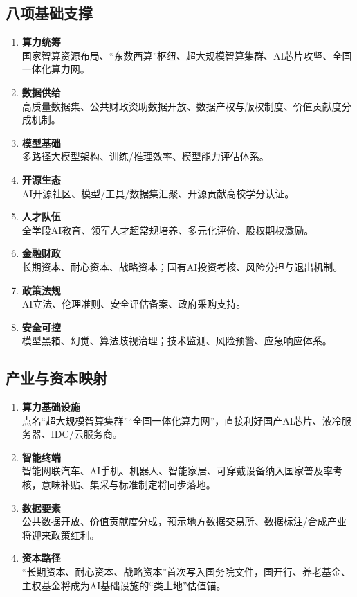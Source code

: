 \subsection{八项基础支撑}
\begin{enumerate}[leftmargin=*, nosep]
    \item \textbf{算力统筹}  \\
    国家智算资源布局、“东数西算”枢纽、超大规模智算集群、AI芯片攻坚、全国一体化算力网。
    \item \textbf{数据供给}  \\
    高质量数据集、公共财政资助数据开放、数据产权与版权制度、价值贡献度分成机制。
    \item \textbf{模型基础}  \\
    多路径大模型架构、训练/推理效率、模型能力评估体系。
    \item \textbf{开源生态}  \\
    AI开源社区、模型/工具/数据集汇聚、开源贡献高校学分认证。
    \item \textbf{人才队伍}  \\
    全学段AI教育、领军人才超常规培养、多元化评价、股权期权激励。
    \item \textbf{金融财政}  \\
    长期资本、耐心资本、战略资本；国有AI投资考核、风险分担与退出机制。
    \item \textbf{政策法规}  \\
    AI立法、伦理准则、安全评估备案、政府采购支持。
    \item \textbf{安全可控}  \\
    模型黑箱、幻觉、算法歧视治理；技术监测、风险预警、应急响应体系。
\end{enumerate}

\subsection{产业与资本映射}
\begin{enumerate}[leftmargin=*, nosep]
    \item \textbf{算力基础设施}  \\
    点名“超大规模智算集群”“全国一体化算力网”，直接利好国产AI芯片、液冷服务器、IDC/云服务商。
    \item \textbf{智能终端}  \\
    智能网联汽车、AI手机、机器人、智能家居、可穿戴设备纳入国家普及率考核，意味补贴、集采与标准制定将同步落地。
    \item \textbf{数据要素}  \\
    公共数据开放、价值贡献度分成，预示地方数据交易所、数据标注/合成产业将迎来政策红利。
    \item \textbf{资本路径}  \\
    “长期资本、耐心资本、战略资本”首次写入国务院文件，国开行、养老基金、主权基金将成为AI基础设施的“类土地”估值锚。
\end{enumerate}

